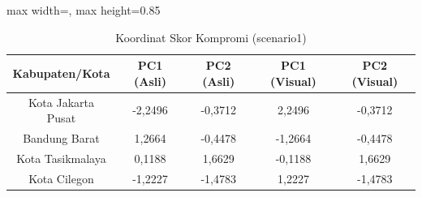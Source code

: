 \begin{table}[H]
\centering
\caption{Koordinat Skor Kompromi (scenario1)} \label{tab:sample1scores}
\begin{adjustbox}{max width=\textwidth, max height=0.85\textheight}
\begin{tabular}{|c|c|c|c|c|}
\hline
\textbf{Kabupaten/Kota} & \textbf{PC1 (Asli)} & \textbf{PC2 (Asli)} & \textbf{PC1 (Visual)} & \textbf{PC2 (Visual)} \\
\hline
Kota Jakarta Pusat & -2,2496 & -0,3712 & 2,2496 & -0,3712 \\
Bandung Barat & 1,2664 & -0,4478 & -1,2664 & -0,4478 \\
Kota Tasikmalaya & 0,1188 & 1,6629 & -0,1188 & 1,6629 \\
Kota Cilegon & -1,2227 & -1,4783 & 1,2227 & -1,4783 \\
\hline
\end{tabular}
\end{adjustbox}
\end{table}